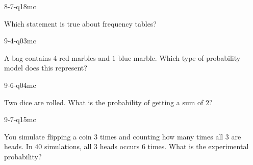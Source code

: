 \begin{practiceQuestion}{8-7-q18}{mc}
\begin{questionText}
Which statement is true about frequency tables?
\end{questionText}
\end{practiceQuestion}

\begin{practiceQuestion}{9-4-q03}{mc}
\begin{questionText}
A bag contains $4$ red marbles and $1$ blue marble. Which type of probability model does this represent?
\end{questionText}
\end{practiceQuestion}

\begin{practiceQuestion}{9-6-q04}{mc}
\begin{questionText}
Two dice are rolled. What is the probability of getting a sum of $2$?
\end{questionText}
\end{practiceQuestion}

\begin{practiceQuestion}{9-7-q15}{mc}
\begin{questionText}
You simulate flipping a coin $3$ times and counting how many times all $3$ are heads. In $40$ simulations, all $3$ heads occurs $6$ times. What is the experimental probability?
\end{questionText}
\end{practiceQuestion}
